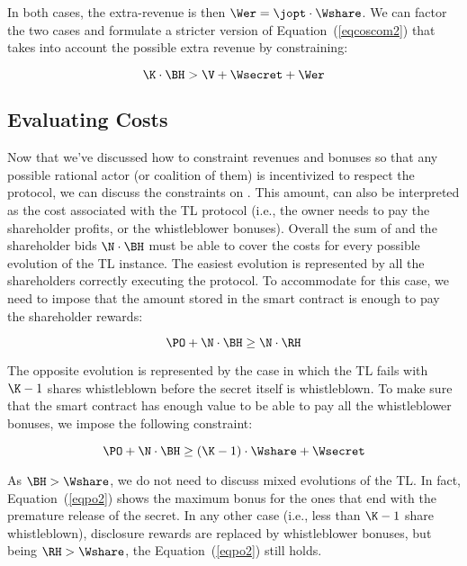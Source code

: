 In both cases, the extra-revenue is then
$ \Wer = \jopt \cdot \Wshare$.
%
We can factor the two cases and formulate a stricter version of Equation~(\ref{eqcoscom2}) that takes into account the possible extra revenue by constraining:

\begin{equation}\label{eqcoscom2w}
\K \cdot \BH > \V + \Wsecret + \Wer
\end{equation}


\subsection{Evaluating Costs}\label{sect:economic_po}

Now that we've discussed how to constraint revenues and bonuses so that any possible rational actor (or coalition of them) is incentivized to respect the protocol, we can discuss the constraints on \PO.
This amount, can also be interpreted as the cost associated with the TL protocol (i.e., the owner needs to pay the shareholder profits, or the whistleblower bonuses). Overall the sum of \PO and the shareholder bids $\N \cdot \BH$ must be able to cover the costs for every possible evolution of the TL instance.
The easiest evolution is represented by all the shareholders correctly executing the protocol. To accommodate for this case, we need to impose that the amount stored in the smart contract is enough to pay the shareholder rewards:

\begin{equation}\label{eqpo1}
\PO + \N \cdot \BH \geq \N \cdot \RH
\end{equation}

The opposite evolution is represented by the case in which the TL fails with $\K-1$ shares whistleblown before the secret itself is whistleblown.
To make sure that the smart contract has enough value to be able to pay all the whistleblower bonuses, we impose the following constraint:

\begin{equation}\label{eqpo2}
\PO + \N \cdot \BH \geq (\K-1) \cdot \Wshare + \Wsecret
\end{equation}

As $\BH > \Wshare$, we do not need to discuss mixed evolutions of the TL. In fact, Equation~(\ref{eqpo2}) shows the maximum bonus for the ones that end with the premature release of the secret. In any other case (i.e., less than $\K-1$ share whistleblown), disclosure rewards are replaced by whistleblower bonuses, but being $\RH > \Wshare$, the Equation~(\ref{eqpo2}) still holds.

